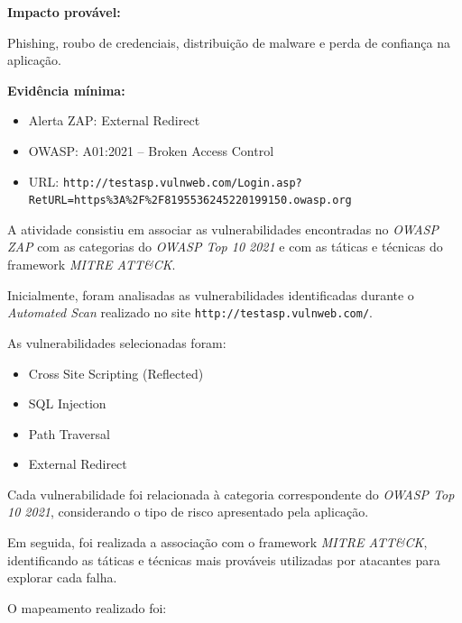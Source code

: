 \textbf{Impacto provável:}

Phishing, roubo de credenciais, distribuição de malware e perda de confiança na
aplicação.

\textbf{Evidência mínima:}

\begin{itemize}
  \item Alerta ZAP: External Redirect
  \item OWASP: A01:2021 -- Broken Access Control
  \item URL:
    \texttt{http://testasp.vulnweb.com/Login.asp?RetURL=https\%3A\%2F\%2F8195536245220199150.owasp.org}
\end{itemize}

\newpage


A atividade consistiu em associar as vulnerabilidades encontradas no
\textit{OWASP ZAP} com as categorias do \textit{OWASP Top 10 2021} e com as
táticas e técnicas do framework \textit{MITRE ATT\&CK}.

Inicialmente, foram analisadas as vulnerabilidades identificadas durante o
\textit{Automated Scan} realizado no site \texttt{http://testasp.vulnweb.com/}.

As vulnerabilidades selecionadas foram:

\begin{itemize}
  \item Cross Site Scripting (Reflected)
  \item SQL Injection
  \item Path Traversal
  \item External Redirect
\end{itemize}

Cada vulnerabilidade foi relacionada à categoria correspondente do
\textit{OWASP Top 10 2021}, considerando o tipo de risco apresentado pela
aplicação.

Em seguida, foi realizada a associação com o framework \textit{MITRE ATT\&CK},
identificando as táticas e técnicas mais prováveis utilizadas por atacantes
para explorar cada falha.

O mapeamento realizado foi:

